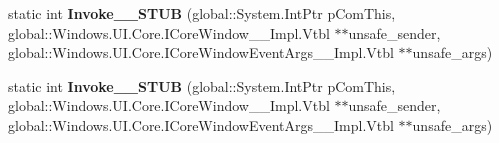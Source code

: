 \begin{DoxyCompactItemize}
static int {\bfseries Invoke\+\_\+\+\_\+\+S\+T\+UB} (global\+::\+System.\+Int\+Ptr p\+Com\+This, global\+::\+Windows.\+U\+I.\+Core.\+I\+Core\+Window\+\_\+\+\_\+\+Impl.\+Vtbl $\ast$$\ast$unsafe\+\_\+sender, global\+::\+Windows.\+U\+I.\+Core.\+I\+Core\+Window\+Event\+Args\+\_\+\+\_\+\+Impl.\+Vtbl $\ast$$\ast$unsafe\+\_\+args)
\item 
\mbox{\label{struct_windows_1_1_foundation_1_1_typed_event_handler___a___windows___u_i___core___core_window__f96fd82f4e79c9942232efb7e426aa23_ae033b486d975fc144c48cf15ed334f94}} 
static int {\bfseries Invoke\+\_\+\+\_\+\+S\+T\+UB} (global\+::\+System.\+Int\+Ptr p\+Com\+This, global\+::\+Windows.\+U\+I.\+Core.\+I\+Core\+Window\+\_\+\+\_\+\+Impl.\+Vtbl $\ast$$\ast$unsafe\+\_\+sender, global\+::\+Windows.\+U\+I.\+Core.\+I\+Core\+Window\+Event\+Args\+\_\+\+\_\+\+Impl.\+Vtbl $\ast$$\ast$unsafe\+\_\+args)
\end{DoxyCompactItemize}
